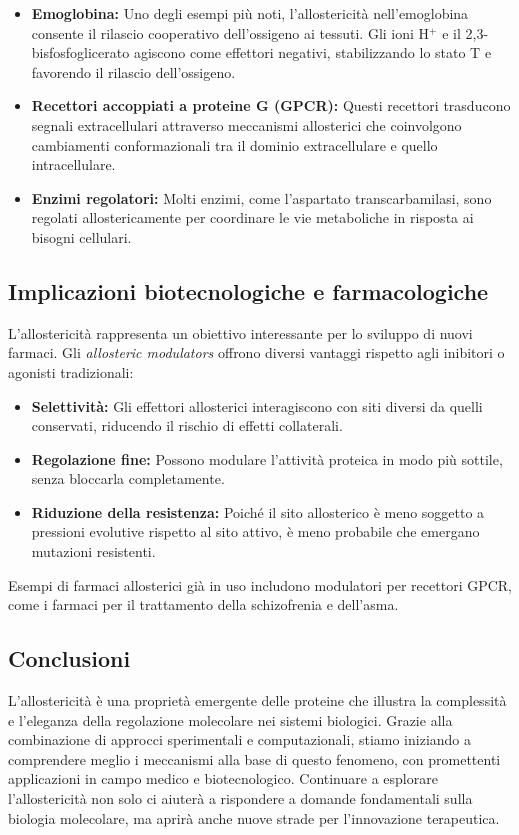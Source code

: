 \documentclass[Lau,binding=0.6cm,oneside,noexaminfo]{sapthesis}
\begin{document}
\begin{itemize}
    \item \textbf{Emoglobina:} Uno degli esempi più noti, l’allostericità nell’emoglobina consente il rilascio cooperativo dell’ossigeno ai tessuti. Gli ioni H\(^+\) e il 2,3-bisfosfoglicerato agiscono come effettori negativi, stabilizzando lo stato T e favorendo il rilascio dell’ossigeno.
    \item \textbf{Recettori accoppiati a proteine G (GPCR):} Questi recettori trasducono segnali extracellulari attraverso meccanismi allosterici che coinvolgono cambiamenti conformazionali tra il dominio extracellulare e quello intracellulare.
    \item \textbf{Enzimi regolatori:} Molti enzimi, come l’aspartato transcarbamilasi, sono regolati allostericamente per coordinare le vie metaboliche in risposta ai bisogni cellulari.
\end{itemize}

\subsection*{Implicazioni biotecnologiche e farmacologiche}
L’allostericità rappresenta un obiettivo interessante per lo sviluppo di nuovi farmaci. Gli \emph{allosteric modulators} offrono diversi vantaggi rispetto agli inibitori o agonisti tradizionali:

\begin{itemize}
    \item \textbf{Selettività:} Gli effettori allosterici interagiscono con siti diversi da quelli conservati, riducendo il rischio di effetti collaterali.
    \item \textbf{Regolazione fine:} Possono modulare l’attività proteica in modo più sottile, senza bloccarla completamente.
    \item \textbf{Riduzione della resistenza:} Poiché il sito allosterico è meno soggetto a pressioni evolutive rispetto al sito attivo, è meno probabile che emergano mutazioni resistenti.
\end{itemize}

Esempi di farmaci allosterici già in uso includono modulatori per recettori GPCR, come i farmaci per il trattamento della schizofrenia e dell’asma.

\subsection*{Conclusioni}
L’allostericità è una proprietà emergente delle proteine che illustra la complessità e l’eleganza della regolazione molecolare nei sistemi biologici. Grazie alla combinazione di approcci sperimentali e computazionali, stiamo iniziando a comprendere meglio i meccanismi alla base di questo fenomeno, con promettenti applicazioni in campo medico e biotecnologico. Continuare a esplorare l’allostericità non solo ci aiuterà a rispondere a domande fondamentali sulla biologia molecolare, ma aprirà anche nuove strade per l’innovazione terapeutica.
\end{document}
